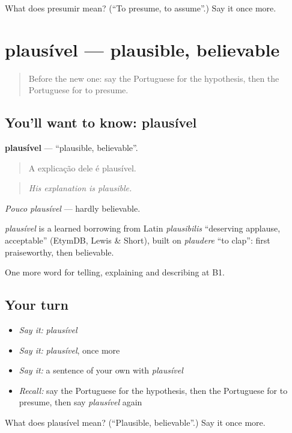 \begin{tcolorbox}[breakable,colback=teal!4,colframe=teal!35!black,title={Before you move on}]
What does presumir mean? (\textquotedblleft{}To presume, to assume\textquotedblright{}.) Say it once more.
\end{tcolorbox}
\section[plausível]{plausível — plausible, believable}

\label{lesson:PT-C368-plausivel}



\begin{quote}
Before the new one: say the Portuguese for the hypothesis, then the Portuguese for to presume.
\end{quote}

\subsection*{You'll want to know: plausível}
\textbf{plausível} — \textquotedblleft{}plausible, believable\textquotedblright{}.

\begin{quote}
A explicação dele é plausível.
\end{quote}

\begin{quote}
\emph{His explanation is plausible.}
\end{quote}

\emph{Pouco plausível} — hardly believable.

\begin{cousinweb}
\emph{plausível} is a learned borrowing from Latin \emph{plausibilis} \textquotedblleft{}deserving applause, acceptable\textquotedblright{} (EtymDB, Lewis \& Short), built on \emph{plaudere} \textquotedblleft{}to clap\textquotedblright{}: first praiseworthy, then believable.
\end{cousinweb}

\begin{grammarlens}[title={What you've built}]
One more word for telling, explaining and describing at B1.
\end{grammarlens}

\subsection*{Your turn}
\begin{itemize}
\raggedright
  \item \emph{Say it:} \emph{plausível}
  \item \emph{Say it:} \emph{plausível}, once more
  \item \emph{Say it:} a sentence of your own with \emph{plausível}
  \item \emph{Recall:} say the Portuguese for the hypothesis, then the Portuguese for to presume, then say \emph{plausível} again
\end{itemize}

\begin{tcolorbox}[breakable,colback=teal!4,colframe=teal!35!black,title={Before you move on}]
What does plausível mean? (\textquotedblleft{}Plausible, believable\textquotedblright{}.) Say it once more.
\end{tcolorbox}
